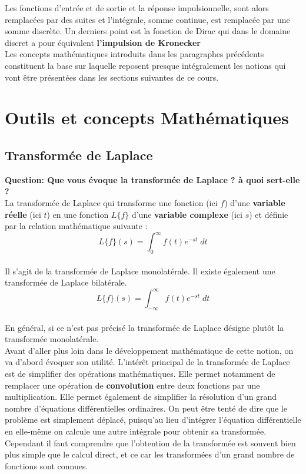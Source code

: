 \documentclass[11pt,a4paper]{article}
\begin{document}
Les fonctions d'entrée et de sortie et la réponse impulsionnelle, sont alors remplacées par des suites et l'intégrale, somme continue, est remplacée par une somme discrète. Un derniers point est la fonction de Dirac qui dans le domaine discret a pour équivalent \textbf{l'impulsion de Kronecker}\\ 

Les concepts mathématiques introduits dans les paragraphes précédents constituent la base sur laquelle reposent presque intégralement les notions qui vont être présentées dans les sections suivantes de ce cours.

\section{Outils et concepts Mathématiques}

\subsection{Transformée de Laplace} 

\textbf{Question: Que vous évoque la transformée de Laplace ? à quoi sert-elle ?}\\

La transformée de Laplace qui transforme une fonction (ici $f$) d'une \textbf{variable réelle} (ici $t$) en une fonction $L\{ f \}$ d'une \textbf{variable complexe} (ici $s$) et définie par la relation mathématique suivante :\\

\[L\{f \}(s) = \int^{\infty}_{0} f(t) e^{-st} \; dt\] \\

Il s'agit de la transformée de Laplace monolatérale. Il existe également une transformée de Laplace bilatérale.\\

\[L\{f \}(s) = \int^{\infty}_{-\infty} f(t) e^{-st} \; dt\]\\

En général, si ce n'est pas précisé la transformée de Laplace désigne plutôt la transformée monolatérale.\\

Avant d'aller plus loin dans le développement mathématique de cette notion, on va d'abord évoquer son utilité. L'intérêt principal de la transformée de Laplace est de simplifier des opérations mathématiques. Elle permet notamment de remplacer une opération de \textbf{convolution} entre deux fonctions par une multiplication. Elle permet également de simplifier la résolution d'un grand nombre d'équations différentielles ordinaires. On peut être tenté de dire que le problème est simplement déplacé, puisqu'au lieu d'intégrer l'équation différentielle en elle-même on calcule une autre intégrale pour obtenir sa transformée. Cependant il faut comprendre que l'obtention de la transformée est souvent bien plus simple que le calcul direct, et ce car les transformées d'un grand nombre de fonctions sont connues.\\
\end{document}
